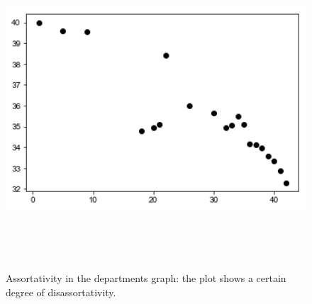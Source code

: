 \documentclass{report}
\theoremstyle{definition}
\theoremstyle{remark}
\begin{document}
 \begin{figure} [H]
 	\centering
 	\centerline{\includegraphics[width = 13cm, height = 12cm, keepaspectratio]{assortativity_dep.png}}
 	\label{Ass_dep}
 	\caption{Assortativity in the departments graph: the plot shows a certain degree of disassortativity.}
 \end{figure}
\end{document}
